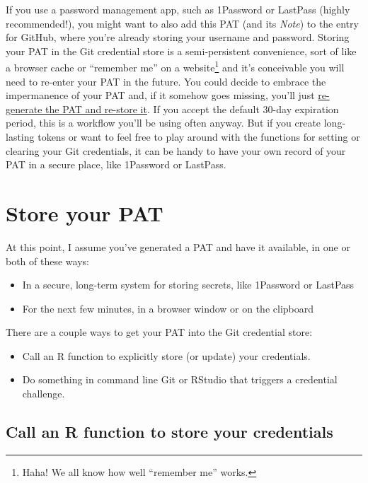 \documentclass[
]{book}
\providecommand{\tightlist}{%
  \setlength{\itemsep}{0pt}\setlength{\parskip}{0pt}}
\begin{document}
If you use a password management app, such as 1Password or LastPass (highly recommended!), you might want to also add this PAT (and its \emph{Note}) to the entry for GitHub, where you're already storing your username and password.
Storing your PAT in the Git credential store is a semi-persistent convenience, sort of like a browser cache or ``remember me'' on a website\footnote{Haha! We all know how well ``remember me'' works.} and it's conceivable you will need to re-enter your PAT in the future.
You could decide to embrace the impermanence of your PAT and, if it somehow goes missing, you'll just \hyperref[regenerate-pat]{re-generate the PAT and re-store it}.
If you accept the default 30-day expiration period, this is a workflow you'll be using often anyway.
But if you create long-lasting tokens or want to feel free to play around with the functions for setting or clearing your Git credentials, it can be handy to have your own record of your PAT in a secure place, like 1Password or LastPass.

\section{Store your PAT}\label{store-pat}

At this point, I assume you've generated a PAT and have it available, in one or both of these ways:

\begin{itemize}
\tightlist
\item
  In a secure, long-term system for storing secrets, like 1Password or LastPass
\item
  For the next few minutes, in a browser window or on the clipboard
\end{itemize}

There are a couple ways to get your PAT into the Git credential store:

\begin{itemize}
\tightlist
\item
  Call an R function to explicitly store (or update) your credentials.
\item
  Do something in command line Git or RStudio that triggers a credential
  challenge.
\end{itemize}

\subsection{Call an R function to store your credentials}\label{call-an-r-function-to-store-your-credentials}
\end{document}
